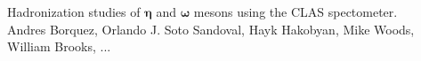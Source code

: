 %
\pagestyle{empty}
\begin{center}

\vspace{10mm}

\huge{Hadronization studies of $\bm{\eta}$ and $\bm{\omega}$ mesons using the CLAS spectometer.\\}
%
\vspace{36mm}
\large{Andres Borquez, Orlando J. Soto Sandoval, Hayk Hakobyan, Mike Woods, William Brooks, ... \\}
%
\end{center}
%
\date{\today}